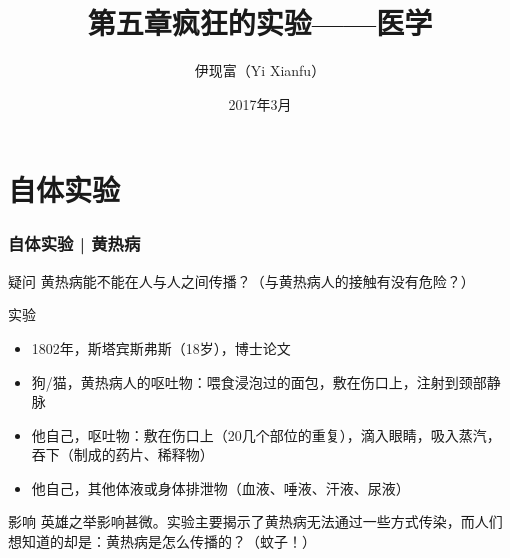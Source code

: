 



\title[医学]{第五章\quad 疯狂的实验——医学}
\author[Yixf]{伊现富（Yi Xianfu）}
\date{2017年3月}



\section{自体实验}
\begin{frame}
  \frametitle{自体实验 | 黄热病}
  \begin{block}{疑问}
    黄热病能不能在人与人之间传播？（与黄热病人的接触有没有危险？）
  \end{block}
  \pause
  \begin{block}{实验}
    \begin{itemize}
      \item 1802年，斯塔宾斯\textbullet 弗斯（18岁），博士论文
      \item 狗/猫，黄热病人的呕吐物：喂食浸泡过的面包，敷在伤口上，注射到颈部静脉
      \item 他自己，呕吐物：敷在伤口上（20几个部位的重复），滴入眼睛，吸入蒸汽，吞下（制成的药片、稀释物）
      \item 他自己，其他体液或身体排泄物（血液、唾液、汗液、尿液）
    \end{itemize}
  \end{block}
  \pause
  \begin{block}{影响}
英雄之举影响甚微。实验主要揭示了黄热病无法通过一些方式传染，而人们想知道的却是：黄热病是怎么传播的？（蚊子！）
  \end{block}
\end{frame}

